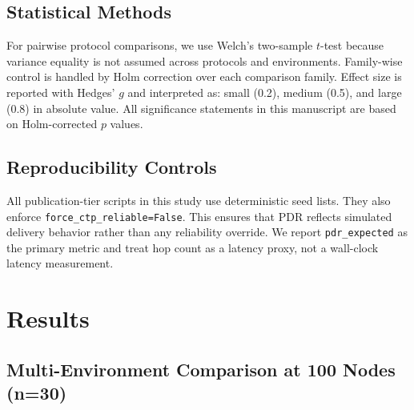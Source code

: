 \documentclass[sensors,article,submit,moreauthors,pdftex]{Definitions/mdpi}
\begin{document}
\subsection{Statistical Methods}
For pairwise protocol comparisons, we use Welch's two-sample $t$-test because variance equality is not assumed across protocols and environments. Family-wise control is handled by Holm correction over each comparison family. Effect size is reported with Hedges' $g$ and interpreted as: small (0.2), medium (0.5), and large (0.8) in absolute value. All significance statements in this manuscript are based on Holm-corrected $p$ values.

\subsection{Reproducibility Controls}
All publication-tier scripts in this study use deterministic seed lists. They also enforce \texttt{force\_ctp\_reliable=False}. This ensures that PDR reflects simulated delivery behavior rather than any reliability override. We report \texttt{pdr\_expected} as the primary metric and treat hop count as a latency proxy, not a wall-clock latency measurement.

\section{Results}
\subsection{Multi-Environment Comparison at 100 Nodes (n=30)}
\begin{table}[H]
\caption{PDR by environment at 100 nodes (mean $\pm$ std).}
\label{tab:pdr100}
\centering
{}
\end{table}
\end{document}
